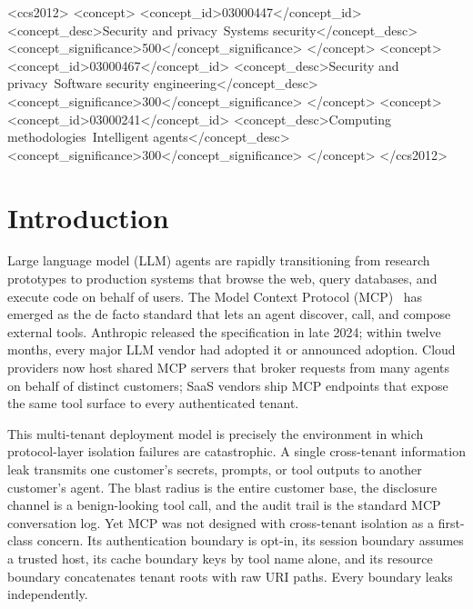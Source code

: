 \documentclass[sigconf, anonymous, natbib=false]{acmart}
\begin{document}
\begin{CCSXML}
<ccs2012>
   <concept>
       <concept_id>03000447</concept_id>
       <concept_desc>Security and privacy~Systems security</concept_desc>
       <concept_significance>500</concept_significance>
   </concept>
   <concept>
       <concept_id>03000467</concept_id>
       <concept_desc>Security and privacy~Software security engineering</concept_desc>
       <concept_significance>300</concept_significance>
   </concept>
   <concept>
       <concept_id>03000241</concept_id>
       <concept_desc>Computing methodologies~Intelligent agents</concept_desc>
       <concept_significance>300</concept_significance>
   </concept>
</ccs2012>
\end{CCSXML}



\maketitle

\section{Introduction}\label{sec:intro}

Large language model (LLM) agents are rapidly transitioning
from research prototypes to production systems that browse
the web, query databases, and execute code on behalf of
users. The Model Context Protocol (MCP)~\cite{mcp_spec} has
emerged as the de facto standard that lets an agent
discover, call, and compose external tools. Anthropic
released the specification in late 2024; within twelve
months, every major LLM vendor had adopted it or announced
adoption. Cloud providers now host shared MCP servers that
broker requests from many agents on behalf of distinct
customers; SaaS vendors ship MCP endpoints that expose the
same tool surface to every authenticated tenant.

This multi-tenant deployment model is precisely the
environment in which protocol-layer isolation failures are
catastrophic. A single cross-tenant information leak
transmits one customer's secrets, prompts, or tool outputs
to another customer's agent. The blast radius is the entire
customer base, the disclosure channel is a benign-looking
tool call, and the audit trail is the standard MCP
conversation log. Yet MCP was not designed with
cross-tenant isolation as a first-class concern. Its
authentication boundary is opt-in, its session boundary
assumes a trusted host, its cache boundary keys by tool name
alone, and its resource boundary concatenates tenant roots
with raw URI paths. Every boundary leaks independently.
\end{document}
